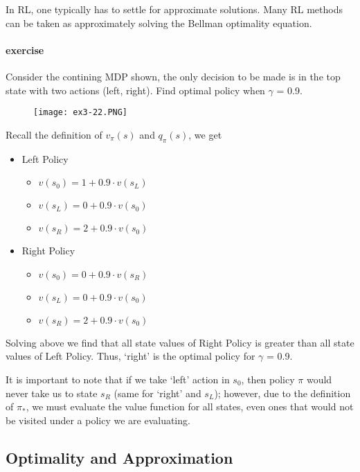 \documentclass[lang=en,mode=geye,device=normal,color=blue,14pt]{elegantnote}
\DeclareMathOperator*{\1}{\mathbbm{1}}
\begin{document}
In RL, one typically has to settle for approximate solutions. Many RL methods can be taken as approximately solving the Bellman optimality equation.

\paragraph{exercise} Consider the contining MDP shown, the only decision to be made is in the top state with two actions (left, right).
Find optimal policy when $\gamma$ = 0.9.

\begin{figure}[!h]
  \centering
  \texttt{[image: ex3-22.PNG]}
  \label{fig:ex3-22}
\end{figure}

Recall the definition of $v_\pi(s)$ and $q_\pi(s)$, we get

\begin{itemize}
\item Left Policy
\begin{itemize}
\item $ v(s_0) = 1 + 0.9\cdot v(s_L) $
\item $ v(s_L) = 0 + 0.9\cdot v(s_0) $
\item $ v(s_R) = 2 + 0.9\cdot v(s_0) $
\end{itemize}
\item Right Policy
\begin{itemize}
\item $ v(s_0) = 0 + 0.9\cdot v(s_R) $
\item $ v(s_L) = 0 + 0.9\cdot v(s_0) $
\item $ v(s_R) = 2 + 0.9\cdot v(s_0) $
\end{itemize}
\end{itemize}
Solving above we find that all state values of Right Policy is greater than all state values of Left Policy. Thus, `right' is the optimal policy for $\gamma$ = 0.9.

It is important to note that if we take `left' action in $s_0$, then policy $\pi$ would never take us to state $s_R$ (same for `right' and $s_L$); however, due to the definition of $\pi_*$, we must evaluate the value function for all states, even ones that would not be visited under a policy we are evaluating.

\subsection{Optimality and Approximation}
\end{document}
